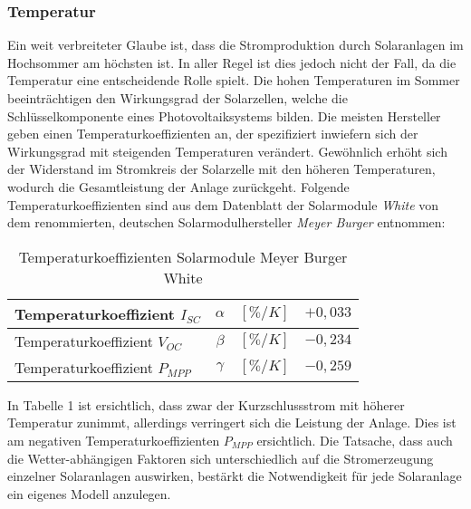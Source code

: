 \documentclass[12pt, a4paper]{article}
\begin{document}
\subsubsection{Temperatur}

Ein weit verbreiteter Glaube ist, dass die Stromproduktion durch Solaranlagen im Hochsommer am höchsten ist. In aller Regel ist dies jedoch nicht der Fall, da die Temperatur eine entscheidende Rolle spielt. Die hohen Temperaturen im Sommer beeinträchtigen den Wirkungsgrad der Solarzellen, welche die Schlüsselkomponente eines Photovoltaiksystems bilden. Die meisten Hersteller geben einen Temperaturkoeffizienten an, der spezifiziert inwiefern sich der Wirkungsgrad mit steigenden Temperaturen verändert. Gewöhnlich erhöht sich der Widerstand im Stromkreis der Solarzelle mit den höheren Temperaturen, wodurch die Gesamtleistung der Anlage zurückgeht. Folgende Temperaturkoeffizienten sind aus dem Datenblatt der Solarmodule \textit{White} von dem renommierten, deutschen Solarmodulhersteller \textit{Meyer Burger} entnommen: \newline


\begin{table}[h]
\begin{center}
\def\arraystretch{1.5}
\setlength\tabcolsep{0.75cm}
\begin{tabular}{| l | c | r | c |}
\hline
Temperaturkoeffizient $I_{SC}$ &	$\alpha$ & 	$[\%/K]$ &		$+0,033$ \\ \hline
Temperaturkoeffizient $V_{OC}$ & 	$\beta$  &	$[\%/K]$ & 		$-0,234$ \\ \hline
Temperaturkoeffizient $P_{MPP}$ & 	$\gamma$  &	$[\%/K]$ & 		$-0,259$ \\ \hline
\end{tabular}
\end{center}
\caption{Temperaturkoeffizienten Solarmodule Meyer Burger White}
\label{tab:temperaturkoeffizienten} 
\end{table}


In Tabelle 1 ist ersichtlich, dass zwar der Kurzschlussstrom mit höherer Temperatur zunimmt, allerdings verringert sich die Leistung der Anlage. Dies ist am negativen Temperaturkoeffizienten $P_{MPP}$ ersichtlich. Die Tatsache, dass auch die Wetter-abhängigen Faktoren sich unterschiedlich auf die Stromerzeugung einzelner Solaranlagen auswirken, bestärkt die Notwendigkeit für jede Solaranlage ein eigenes Modell anzulegen.
\end{document}
